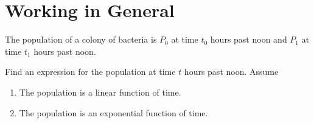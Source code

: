 \documentclass{ximera}
\begin{document}
\section{Working in General}
\begin{question} \label{QpDfreg91}
The population of a colony of bacteria is $P_0$ at time $t_0$ hours past noon and $P_1$ at time $t_1$ hours past noon.

Find an expression for the population at time $t$ hours past noon. Assume
\begin{enumerate}
\item The population is a linear function of time.

\item The population is an exponential function of time.
\end{enumerate}
\end{question}
\end{document}
